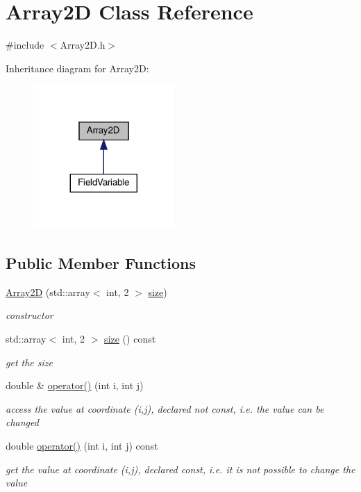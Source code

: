 \hypertarget{classArray2D}{}\section{Array2D Class Reference}
\label{classArray2D}


{\ttfamily \#include $<$Array2\+D.\+h$>$}



Inheritance diagram for Array2D\+:\nopagebreak
\begin{figure}[H]
\begin{center}
\leavevmode
\includegraphics[width=152pt]{classArray2D__inherit__graph}
\end{center}
\end{figure}
\subsection*{Public Member Functions}
\begin{DoxyCompactItemize}
\item 
\mbox{\hyperlink{classArray2D_a16521417dfdf67ec694bfb7747df9000}{Array2D}} (std\+::array$<$ int, 2 $>$ \mbox{\hyperlink{classArray2D_accf87be860645d6c50d6ba6fa39ec6f9}{size}})
\begin{DoxyCompactList}\small\item\em constructor \end{DoxyCompactList}\item 
std\+::array$<$ int, 2 $>$ \mbox{\hyperlink{classArray2D_accf87be860645d6c50d6ba6fa39ec6f9}{size}} () const
\begin{DoxyCompactList}\small\item\em get the size \end{DoxyCompactList}\item 
double \& \mbox{\hyperlink{classArray2D_a9d49e5544f4acf51a57dcbb0ed1bb0f8}{operator()}} (int i, int j)
\begin{DoxyCompactList}\small\item\em access the value at coordinate (i,j), declared not const, i.\+e. the value can be changed \end{DoxyCompactList}\item 
double \mbox{\hyperlink{classArray2D_af745718ec25b815051de2d0c3c94e0d2}{operator()}} (int i, int j) const
\begin{DoxyCompactList}\small\item\em get the value at coordinate (i,j), declared const, i.\+e. it is not possible to change the value \end{DoxyCompactList}\end{DoxyCompactItemize}
